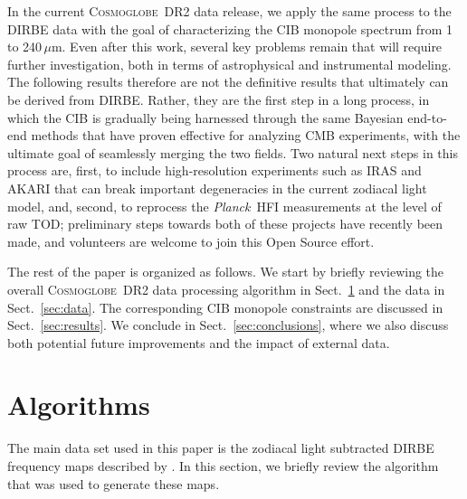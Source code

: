 \documentclass{aa}
\def\Planck{\textit{Planck}}
\newcommand{\cosmoglobe}{\textsc{Cosmoglobe}}
\begin{document}
In the current \cosmoglobe\ DR2 data release, we apply the same process to the DIRBE data with the goal of characterizing the CIB monopole spectrum from 1 to 240$\,\mu\mathrm{m}$. Even after this work, several key problems remain that will require further investigation, both in terms of astrophysical and instrumental modeling. The following results therefore are not the definitive results that ultimately can be derived from DIRBE. Rather, they are the first step in a long process, in which the CIB is gradually being harnessed through the same Bayesian end-to-end methods that have proven effective for analyzing CMB experiments, with the ultimate goal of seamlessly merging the two fields. Two natural next steps in this process are, first, to include high-resolution experiments such as IRAS \citep{neugebauer:1984} and AKARI \citep{murakami:2007} that can break important degeneracies in the current zodiacal light model, and, second, to reprocess the \Planck\ HFI measurements at the level of raw TOD; preliminary steps towards both of these projects have recently been made, and volunteers are welcome to join this Open Source effort.


The rest of the paper is organized as follows.
We start by briefly reviewing the overall \cosmoglobe\ DR2 data processing algorithm in Sect.~\ref{sec:algorithm} and the data in Sect.~\ref{sec:data}. The corresponding CIB monopole constraints are discussed in Sect.~\ref{sec:results}. We conclude in Sect.~\ref{sec:conclusions}, where we also discuss both potential future improvements and the impact of external data.




\section{Algorithms}
\label{sec:algorithm}

The main data set used in this paper is the zodiacal light subtracted
DIRBE frequency maps described by \citet{CG02_01}. In this section, we
briefly review the algorithm that was used to generate these maps.

\end{document}
